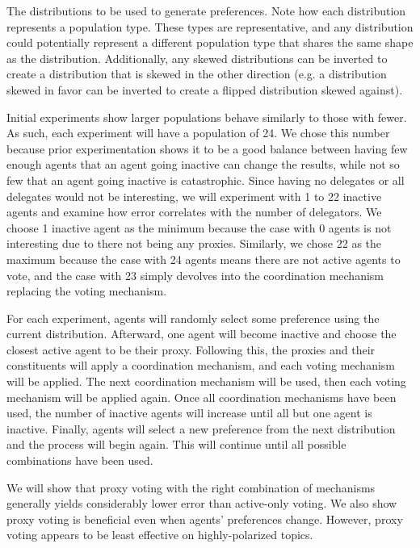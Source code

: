 \begin{table}[!htbp]
    \renewcommand{\arraystretch}{1.3}

    \caption{
        The distributions to be used to generate preferences.
        Note how each distribution represents a population type.
        These types are representative, and any distribution could potentially
        represent a different population type that shares the same shape as the
        distribution.
        Additionally, any skewed distributions can be inverted to create a
        distribution that is skewed in the other direction (e.g. a distribution
        skewed in favor can be inverted to create a flipped distribution skewed
        against).
    }
    \label{tab:distributions-used}

    \centering
    
\end{table}

Initial experiments show larger populations behave similarly to those with fewer.
As such, each experiment will have a population of 24.
We chose this number because prior experimentation shows it to be a good balance
between having few enough agents that an agent going inactive can change the
results, while not so few that an agent going inactive is catastrophic.
Since having no delegates or all delegates would not be interesting, we will
experiment with 1 to 22 inactive agents and examine how error correlates with
the number of delegators.
We choose 1 inactive agent as the minimum because the case with 0 agents is not
interesting due to there not being any proxies.  
Similarly, we chose 22 as the maximum because the case with 24 agents means there are
not active agents to vote, and the case with 23 simply devolves into the coordination
mechanism replacing the voting mechanism.

For each experiment, agents will randomly select some preference using the current
distribution.
Afterward, one agent
will become inactive and choose the closest active agent to be their proxy.
Following this, the proxies and their constituents will apply a coordination
mechanism, and each voting mechanism will be applied.
The next coordination mechanism will be used, then each voting mechanism will be
applied again.
Once all coordination mechanisms have been used, the number of inactive agents will
increase until all but one agent is inactive.  
Finally, agents will select a new preference from the next distribution and the
process will begin again.
This will continue until all possible combinations have been used.  

We will show that proxy voting with the right combination of mechanisms generally
yields considerably lower error than active-only voting.
We also show proxy voting is beneficial even when agents' preferences change.
However, proxy voting appears to be least effective on highly-polarized topics.
